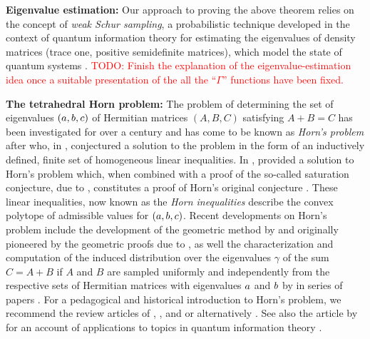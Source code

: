 \documentclass[notitlepage, 10pt]{article}
\begin{document}
\vspace{1em}
\textbf{Eigenvalue estimation:}
Our approach to proving the above theorem relies on the concept of \textit{weak Schur sampling}, a probabilistic technique developed in the context of quantum information theory for estimating the eigenvalues of density matrices (trace one, positive semidefinite matrices), which model the state of quantum systems \cite{keyl2001estimating,christandl2008quantum,odonnell2016efficient,hayashi2002quantum,childs2007weak,hayashi2017group}.
\textcolor{red}{TODO: Finish the explanation of the eigenvalue-estimation idea once a suitable presentation of the all the ``$\Gamma$'' functions have been fixed.}




\vspace{1em}
\textbf{The tetrahedral Horn problem:}
The problem of determining the set of eigenvalues $(a,b,c)$ of Hermitian matrices $(A,B,C)$ satisfying $A+B=C$ has been investigated for over a century \cite{weyl1912asymptotische,fan1949theorem,lidskii1953proper,wielandt1955extremum,thompson1971eigenvalues,thompson1970eigenvalues} and has come to be known as \textit{Horn's problem} after \citeauthor{horn1962eigenvalues} who, in \citeyear{horn1962eigenvalues}, conjectured a solution to the problem in the form of an inductively defined, finite set of homogeneous linear inequalities.
In \citeyear{klyachko1998stable}, \citeauthor{klyachko1998stable} provided a solution to Horn's problem \cite{klyachko1998stable} which, when combined with a proof of the so-called saturation conjecture, due to \citeauthor{knutson1999honeycomb} \cite{knutson1999honeycomb}, constitutes a proof of Horn's original conjecture \cite{fulton1998eigenvalues}.
These linear inequalities, now known as the \textit{Horn inequalities} describe the convex polytope of admissible values for $(a,b,c)$.
Recent developments on Horn's problem include the development of the geometric method by \citeauthor{sherman2015geometric} \cite{sherman2015geometric} and \citeauthor{berline2018horn} \cite{berline2018horn} originally pioneered by the geometric proofs due to \citeauthor{belkale2002geometric} \cite{belkale2002geometric,belkale2005geometric}, as well the characterization and computation of the induced distribution over the eigenvalues $\gamma$ of the sum $C=A+B$ if $A$ and $B$ are sampled uniformly and independently from the respective sets of Hermitian matrices with eigenvalues $a$ and $b$ by \citeauthor{coquereaux2019revisiting} in series of papers \cite{coquereaux2018orbital,coquereaux2018orbital,coquereaux2019revisiting,zuber2018horn}.
For a pedagogical and historical introduction to Horn's problem, we recommend the review articles of \citeauthor{bhatia2001linear} \cite{bhatia2001linear}, \citeauthor{knutson2000symplectic} \cite{knutson2000symplectic}, and \citeauthor{fulton2000eigenvalues} \cite{fulton2000eigenvalues} or alternatively \cite[Appendix D]{niculescu2006convex}.
See also the article by \citeauthor{daftuar2005quantum} for an account of applications to topics in quantum information theory \cite{daftuar2005quantum}.
\end{document}
